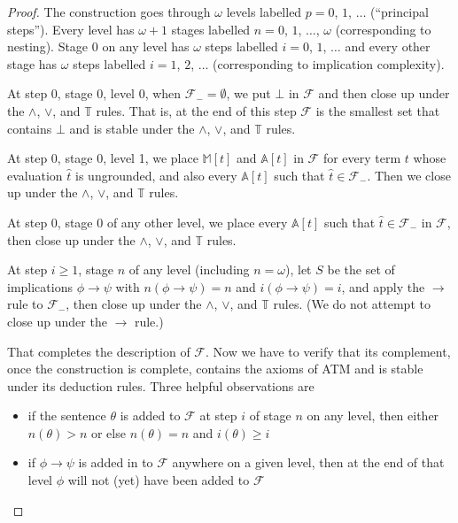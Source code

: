 \documentclass{amsart}
\theoremstyle{definition}
\begin{document}
\begin{proof}
  The construction goes through $\omega$ levels labelled $p = 0$, $1$, $\ldots$ (``principal steps''). Every level has
  $\omega + 1$ stages labelled $n = 0$, $1$, $\ldots$, $\omega$ (corresponding to nesting). Stage $0$ on any level has $\omega$
  steps labelled $i = 0$, $1$, $\ldots$ and every other stage has $\omega$ steps labelled $i = 1$, $2$, $\ldots$ (corresponding
to implication
  complexity).

  At step 0, stage 0, level 0, when $\mathcal{F}_- = \emptyset$, we put $\bot$ in $\mathcal{F}$ and then close up
  under the $\wedge$, $\vee$, and $\mathbb{T}$ rules. That is, at the end of this step $\mathcal{F}$ is the smallest
  set that contains $\bot$ and is stable under the $\wedge$, $\vee$, and $\mathbb{T}$ rules.

  At step 0, stage 0, level 1, we place $\mathbb{M}[t]$ and $\mathbb{A}[t]$ in $\mathcal{F}$ for every term $t$
  whose evaluation $\hat{t}$ is ungrounded, and also every $\mathbb{A}[t]$ such that $\hat{t} \in \mathcal{F}_-$.
  Then we close up under the $\wedge$, $\vee$, and $\mathbb{T}$ rules.

  At step 0, stage 0 of any other level, we place every $\mathbb{A}[t]$ such that $\hat{t} \in \mathcal{F}_-$
  in $\mathcal{F}$, then close up under the $\wedge$, $\vee$, and $\mathbb{T}$ rules.

  At step $i \geq 1$, stage $n$ of any level (including $n = \omega$), let $S$ be the set of implications $\phi \to \psi$ with
  $n(\phi \to \psi) = n$ and $i(\phi \to \psi) = i$, and apply the $\to$ rule to $\mathcal{F}_-$, then
  close up under the $\wedge$, $\vee$, and $\mathbb{T}$ rules. (We do not attempt to close up under the $\to$ rule.)

  That completes the description of $\mathcal{F}$. Now we have to verify that its complement, once the construction is complete, contains the axioms of ATM and is stable under its deduction rules. Three helpful observations are

  \begin{itemize}
  \item if the sentence $\theta$ is added to $\mathcal{F}$ at step $i$ of stage $n$ on any level, then either
    $n(\theta) > n$ or else $n(\theta) = n$ and $i(\theta) \geq i$

  \item if $\phi \to \psi$ is added in to $\mathcal{F}$ anywhere on a given level, then at the end of that level
    $\phi$ will not (yet) have been added to $\mathcal{F}$


\end{itemize}
\end{proof}
\end{document}
